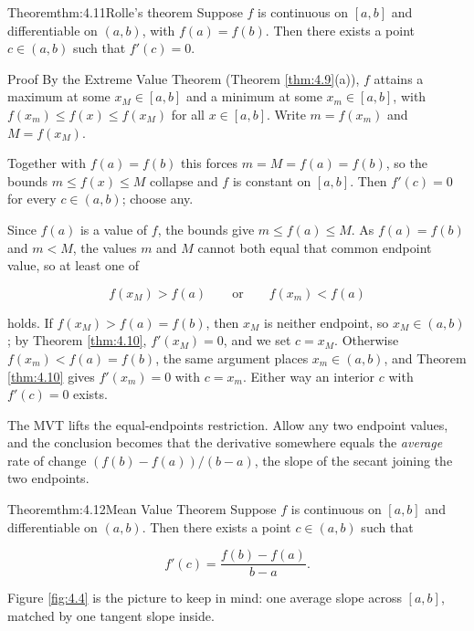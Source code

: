 \documentclass[a4paper,12pt,oneside]{memoir}
\begin{document}
\begin{envtheorem}{Theorem}{thm:4.11}{Rolle’s theorem}
Suppose \(f\) is continuous on \([a, b]\) and differentiable on \((a, b)\), with \(f(a) = f(b)\). Then there exists a point \(c \in (a, b)\) such that \(f'(c) = 0\).
\end{envtheorem}
\begin{envproof}{Proof}{}{}
By the Extreme Value Theorem (Theorem \ref{thm:4.9}(a)), \(f\) attains a maximum at some \(x_{M} \in [a, b]\) and a minimum at some \(x_{m} \in [a, b]\), with \(f(x_{m}) \le f(x) \le f(x_{M})\) for all \(x \in [a, b]\). Write \(m = f(x_{m})\) and \(M = f(x_{M})\).

 Together with \(f(a) = f(b)\) this forces \(m = M = f(a) = f(b)\), so the bounds \(m \le f(x) \le M\) collapse and \(f\) is constant on \([a, b]\). Then \(f'(c) = 0\) for every \(c \in (a, b)\); choose any.

 Since \(f(a)\) is a value of \(f\), the bounds give \(m \le f(a) \le M\). As \(f(a) = f(b)\) and \(m < M\), the values \(m\) and \(M\) cannot both equal that common endpoint value, so at least one of

\[ f(x_{M}) > f(a) \qquad \text{or} \qquad f(x_{m}) < f(a) \]

holds. If \(f(x_{M}) > f(a) = f(b)\), then \(x_{M}\) is neither endpoint, so \(x_{M} \in (a, b)\); by Theorem \ref{thm:4.10}, \(f'(x_{M}) = 0\), and we set \(c = x_{M}\). Otherwise \(f(x_{m}) < f(a) = f(b)\), the same argument places \(x_{m} \in (a, b)\), and Theorem \ref{thm:4.10} gives \(f'(x_{m}) = 0\) with \(c = x_{m}\). Either way an interior \(c\) with \(f'(c) = 0\) exists. \qedmark
\end{envproof}
The MVT lifts the equal-endpoints restriction. Allow any two endpoint values, and the conclusion becomes that the derivative somewhere equals the \emph{average} rate of change \((f(b) - f(a))/(b - a)\), the slope of the secant joining the two endpoints.

\begin{envtheorem}{Theorem}{thm:4.12}{Mean Value Theorem}
Suppose \(f\) is continuous on \([a, b]\) and differentiable on \((a, b)\). Then there exists a point \(c \in (a, b)\) such that

\[ f'(c) = \frac{f(b) - f(a)}{b - a}. \]
\end{envtheorem}
Figure \ref{fig:4.4} is the picture to keep in mind: one average slope across \([a,b]\), matched by one tangent slope inside.
\end{document}
